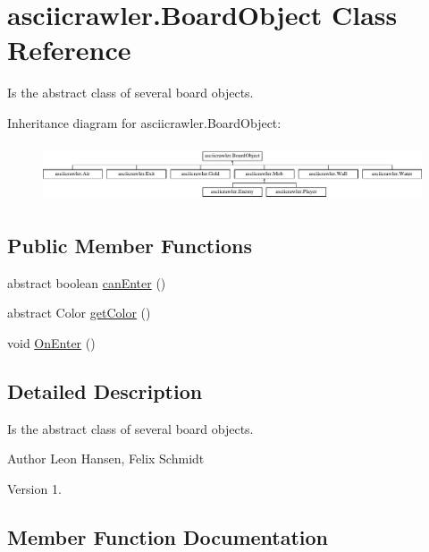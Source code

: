 \hypertarget{classasciicrawler_1_1BoardObject}{}\section{asciicrawler.\+Board\+Object Class Reference}
\label{classasciicrawler_1_1BoardObject}


Is the abstract class of several board objects.  


Inheritance diagram for asciicrawler.\+Board\+Object\+:\begin{figure}[H]
\begin{center}
\leavevmode
\includegraphics[height=1.707317cm]{classasciicrawler_1_1BoardObject}
\end{center}
\end{figure}
\subsection*{Public Member Functions}
\begin{DoxyCompactItemize}
\item 
abstract boolean \hyperlink{classasciicrawler_1_1BoardObject_a15efd8cf373a6cc12ca9b799a9fdc920}{can\+Enter} ()
\item 
abstract Color \hyperlink{classasciicrawler_1_1BoardObject_a64d367ca58baa54f85c5d266c0d01ca9}{get\+Color} ()
\item 
void \hyperlink{classasciicrawler_1_1BoardObject_aa9f18f80f01310da87221b78cf15de66}{On\+Enter} ()
\end{DoxyCompactItemize}


\subsection{Detailed Description}
Is the abstract class of several board objects. 

\begin{DoxyAuthor}{Author}
Leon Hansen, Felix Schmidt 
\end{DoxyAuthor}
\begin{DoxyVersion}{Version}
1. 
\end{DoxyVersion}


\subsection{Member Function Documentation}
\mbox{\label{classasciicrawler_1_1BoardObject_a15efd8cf373a6cc12ca9b799a9fdc920}} 
